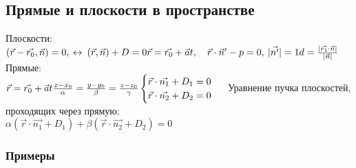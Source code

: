\documentclass[12pt]{article}
\DeclarePairedDelimiter\abs{\lvert}{\rvert}%
\begin{document}
\vspace{2cm}
\subsection{Прямые и плоскости в пространстве}
Плоскости:\\
$
(\vec{r}-\vec{r_0}, \vec{n})=0, \: \leftrightarrow \: (\vec{r}, \vec{n})+D=0\\
\vec{r}=\vec{r_0}+\vec{a}t, \quad \vec{r}\cdot \vec{n}'-p=0, \: \abs{\vec{n'}}=1\\
d=\frac{\abs{\vec{r_1} \cdot \vec{n}}}{\abs{\vec{n}}}\\
$
Прямые:\\
$
\vec{r}=\vec{r_0}+\vec{a}t\\
\frac{x-x_0}{\alpha}=\frac{y-y_0}{\beta}=\frac{z-z_0}{\gamma}\\
\begin{cases}
	\vec{r} \cdot \vec{n_1} + D_1 = 0\\
	\vec{r} \cdot \vec{n_2} + D_2 = 0\\
\end{cases}\\
$
Уравнение пучка плоскостей, проходящих через прямую: \\
$\alpha (\vec{r} \cdot \vec{n_1} + D_1) + \beta (\vec{r} \cdot \vec{n_2} + D_2)=0$\\

\subsubsection{Примеры}
\end{document}

